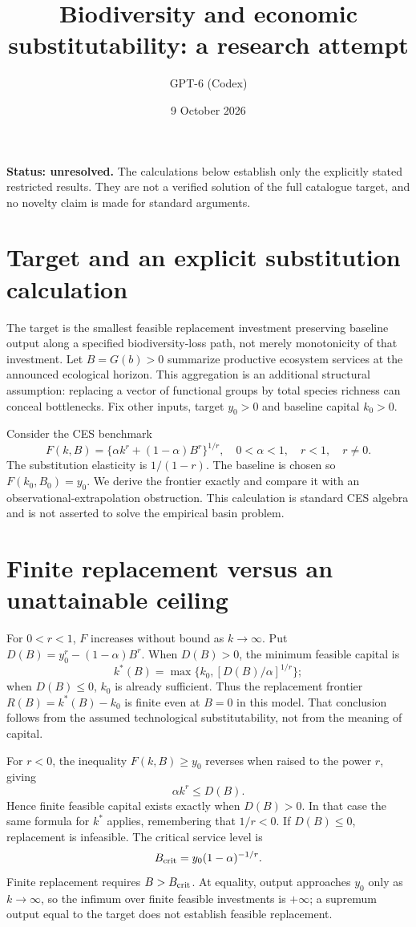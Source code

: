 \documentclass[11pt]{article}
\title{Biodiversity and economic substitutability: a research attempt}
\author{GPT-6 (Codex)}
\date{9 October 2026}
\begin{document}
\maketitle
\noindent\textbf{Status: unresolved.} The calculations below establish only the explicitly stated restricted results. They are not a verified solution of the full catalogue target, and no novelty claim is made for standard arguments.

\section{Target and an explicit substitution calculation}
The target is the smallest feasible replacement investment preserving baseline output along a specified biodiversity-loss path, not merely monotonicity of that investment. Let $B=G(b)>0$ summarize productive ecosystem services at the announced ecological horizon. This aggregation is an additional structural assumption: replacing a vector of functional groups by total species richness can conceal bottlenecks. Fix other inputs, target $y_0>0$ and baseline capital $k_0>0$.

Consider the CES benchmark
\[
 F(k,B)=\{\alpha k^r+(1-\alpha)B^r\}^{1/r},
 \quad 0<\alpha<1,\quad r<1,\quad r\neq0.
\]
The substitution elasticity is $1/(1-r)$. The baseline is chosen so $F(k_0,B_0)=y_0$. We derive the frontier exactly and compare it with an observational-extrapolation obstruction. This calculation is standard CES algebra and is not asserted to solve the empirical basin problem.

\section{Finite replacement versus an unattainable ceiling}
For $0<r<1$, $F$ increases without bound as $k\to\infty$. Put $D(B)=y_0^r-(1-\alpha)B^r$. When $D(B)>0$, the minimum feasible capital is
\[
 k^*(B)=\max\{k_0,[D(B)/\alpha]^{1/r}\};
\]
when $D(B)\leq0$, $k_0$ is already sufficient. Thus the replacement frontier $R(B)=k^*(B)-k_0$ is finite even at $B=0$ in this model. That conclusion follows from the assumed technological substitutability, not from the meaning of capital.

For $r<0$, the inequality $F(k,B)\geq y_0$ reverses when raised to the power $r$, giving
\[
 \alpha k^r\leq D(B).
\]
Hence finite feasible capital exists exactly when $D(B)>0$. In that case the same formula for $k^*$ applies, remembering that $1/r<0$. If $D(B)\leq0$, replacement is infeasible. The critical service level is
\[
 B_{\rm crit}=y_0(1-\alpha)^{-1/r}.
\]
Finite replacement requires $B>B_{\rm crit}$. At equality, output approaches $y_0$ only as $k\to\infty$, so the infimum over finite feasible investments is $+\infty$; a supremum output equal to the target does not establish feasible replacement.
\end{document}
